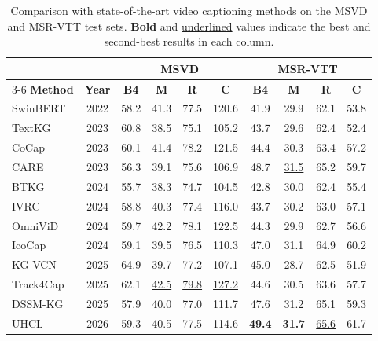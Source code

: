 \begin{table}[!t]
\caption{Comparison with state-of-the-art video captioning methods on the MSVD and MSR-VTT test sets. \textbf{Bold} and \underline{underlined} values indicate the best and second-best results in each column.}
\label{tab:sota_msvd_msrvtt}
\centering
\begin{tabular}{l c cccc cccc}
\hline\hline
 & & \multicolumn{4}{c}{\textbf{MSVD}} & \multicolumn{4}{c}{\textbf{MSR-VTT}} \\
\cline{3-6} \cline{7-10}
\textbf{Method} & \textbf{Year} & \textbf{B4} & \textbf{M} & \textbf{R} & \textbf{C} & \textbf{B4} & \textbf{M} & \textbf{R} & \textbf{C} \\
\hline
SwinBERT~\cite{linSwinBERTEndtoEndTransformers2022} & 2022 & 58.2 & 41.3 & 77.5 & 120.6 & 41.9 & 29.9 & 62.1 & 53.8 \\
TextKG~\cite{guTextKnowledgeGraph2023} & 2023 & 60.8 & 38.5 & 75.1 & 105.2 & 43.7 & 29.6 & 62.4 & 52.4 \\
CoCap~\cite{shenAccurateFastCompressed2023} & 2023 & 60.1 & 41.4 & 78.2 & 121.5 & 44.4 & 30.3 & 63.4 & 57.2 \\
CARE~\cite{yangConceptAwareVideoCaptioning2023} & 2023 & 56.3 & 39.1 & 75.6 & 106.9 & 48.7 & \underline{31.5} & 65.2 & 59.7 \\
BTKG~\cite{zhongBidirectionalTransformerKnowledge2024} & 2024 & 55.7 & 38.3 & 74.7 & 104.5 & 42.8 & 30.0 & 62.4 & 55.4 \\
IVRC~\cite{tianRethinkVideoRetrieval2024} & 2024 & 58.8 & 40.3 & 77.4 & 116.0 & 43.7 & 30.2 & 63.0 & 57.1 \\
OmniViD~\cite{wangOmniViDGenerativeFramework2024} & 2024 & 59.7 & 42.2 & 78.1 & 122.5 & 44.3 & 29.9 & 62.7 & 56.6 \\
IcoCap~\cite{liangIcoCapImprovingVideo2024} & 2024 & 59.1 & 39.5 & 76.5 & 110.3 & 47.0 & 31.1 & 64.9 & 60.2 \\
KG-VCN~\cite{yuanFullyExploringObject2025} & 2025 & \underline{64.9} & 39.7 & 77.2 & 107.1 & 45.0 & 28.7 & 62.5 & 51.9 \\
Track4Cap~\cite{luoFramebyFrameMultiObjectTrackingGuided2025} & 2025 & 62.1 & \underline{42.5} & \underline{79.8} & \underline{127.2} & 44.6 & 30.5 & 63.6 & 57.7 \\
DSSM-KG~\cite{sunDSSMKGDualStreamStateSpace2025} & 2025 & 57.9 & 40.0 & 77.0 & 111.7 & 47.6 & 31.2 & 65.1 & 59.3 \\
UHCL~\cite{sunUnifiedHierarchicalContrastive2026} & 2026 & 59.3 & 40.5 & 77.5 & 114.6 & \textbf{49.4} & \textbf{31.7} & \underline{65.6} & 61.7 \\

\end{tabular}
\end{table}
